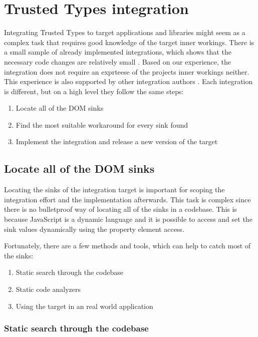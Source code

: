 \chapter{Trusted Types integration}
\label{tt_integration_setup}

Integrating Trusted Types to target applications and libraries might seem as a complex task that
requires good knowledge of the target inner workings. There is a small sample of already implemented
integrations, which shows that the necessary code changes are relatively small
\cite{tt_integration_list}. Based on our experience, the integration does not require an exprteese
of the projects inner workings neither. This experience is also supported by other integration
authors \cite{tt_web_framework_paper}. Each integration is different, but on a high level they
follow the same steps:

\begin{enumerate}
  \item Locate all of the DOM sinks
  \item Find the most suitable workaround for every sink found
  \item Implement the integration and release a new version of the target
\end{enumerate}

\section{Locate all of the DOM sinks}

Locating the sinks of the integration target is important for scoping the integration effort and the
implementation afterwards. This task is complex since there is no bulletproof way of locating all of
the sinks in a codebase. This is because JavaScript is a dynamic language and it is possible to
access and set the sink values dynamically using the property element access.

Fortunately, there are a few methods and tools, which can help to catch most of the sinks:

\begin{enumerate}
  \item Static search through the codebase
  \item Static code analyzers
  \item Using the target in an real world application
\end{enumerate}

\subsection{Static search through the codebase}

